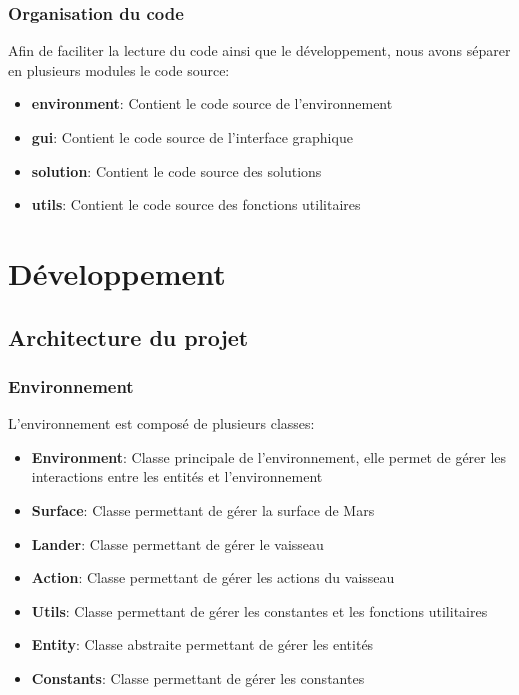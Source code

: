 \documentclass[french,a4paper,10pt,twocolumn]{article}
\begin{document}
\subsubsection{Organisation du code}

Afin de faciliter la lecture du code ainsi que le développement, nous avons séparer en plusieurs modules le code source:
\begin{itemize}
    \item \textbf{environment}: Contient le code source de l'environnement
    \item \textbf{gui}: Contient le code source de l'interface graphique
    \item \textbf{solution}: Contient le code source des solutions
    \item \textbf{utils}: Contient le code source des fonctions utilitaires
\end{itemize}



\section{Développement}



\subsection{Architecture du projet}

\subsubsection{Environnement}

L'environnement est composé de plusieurs classes:
\begin{itemize}
    \item \textbf{Environment}: Classe principale de l'environnement, elle permet de gérer les interactions entre les entités et l'environnement
    \item \textbf{Surface}: Classe permettant de gérer la surface de Mars
    \item \textbf{Lander}: Classe permettant de gérer le vaisseau
    \item \textbf{Action}: Classe permettant de gérer les actions du vaisseau
    \item \textbf{Utils}: Classe permettant de gérer les constantes et les fonctions utilitaires
    \item \textbf{Entity}: Classe abstraite permettant de gérer les entités
    \item \textbf{Constants}: Classe permettant de gérer les constantes
\end{itemize}
\end{document}
